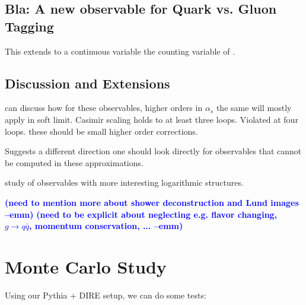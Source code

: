 \documentclass[letterpaper,11pt]{article}
\newcommand{\emm}[1]{\marginpar{\raggedright\scriptsize\textbf{\textcolor{blue}{emm}}}  \textbf{\textcolor{blue}{(#1 --emm)}}}
\begin{document}
\subsection{Bla: A new observable for Quark vs. Gluon Tagging}
\label{sec:new_obs}

This extends to a continuous variable the counting variable of \cite{Frye:2017yrw}.


\subsection{Discussion and Extensions}
\label{sec:discuss}

can discuss how for these observables, higher orders in $\alpha_s$ the same will mostly apply in soft limit. Casimir scaling holds to at least three loops. Violated at four loops\cite{Armoni:2006ux}\cite{Boels:2017skl}.\cite{Grozin:2017css} \cite{Moch:2017uml} these should be small higher order corrections.

Suggests a different direction one should look directly for observables that cannot be computed in these approximations.

study of observables with more interesting logarithmic structures.

\noindent
\emm{need to mention more about shower deconstruction and Lund images}
\emm{need to be explicit about neglecting e.g. flavor changing, $g\to q\bar q$, momentum conservation, ...}

\section{Monte Carlo Study}
\label{sec:squirrelemperical}

Using our Pythia + DIRE setup, we can do some tests:
\end{document}
